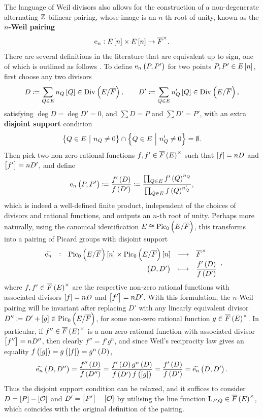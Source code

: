 The language of Weil divisors also allows for the construction of a non-degenerate alternating $ \mathbb{Z} $-bilinear pairing, whose image is an $ n $-th root of unity, known as the \textbf{$ n $-Weil pairing} \cite[Proposition III.8.1]{Sil09}
$$ \e_n : E\sbr{n} \times E\sbr{n} \to \overline{F}^\times. $$
There are several definitions in the literature that are equivalent up to sign, one of which is outlined as follows \cite[Exercise 3.16]{Sil09}. To define $ \e_n\br{P, P'} $ for two points $ P, P' \in E\sbr{n} $, first choose any two divisors
$$ D \coloneqq \sum_{Q \in E} n_Q\sbr{Q} \in \Div, \qquad D' \coloneqq \sum_{Q \in E} n_Q'\sbr{Q} \in \Div, $$
satisfying $ \deg D = \deg D' = 0 $, and $ \sum D = P $ and $ \sum D' = P' $, with an extra \textbf{disjoint support} condition
$$ \cbr{Q \in E \st n_Q \ne 0} \cap \cbr{Q \in E \st n_Q' \ne 0} = \emptyset. $$
Then pick two non-zero rational functions $ f, f' \in \overline{F}\br{E}^\times $ such that $ \sbr{f} = nD $ and $ \sbr{f'} = nD' $, and define
$$ \e_n\br{P, P'} \coloneqq \dfrac{f'\br{D}}{f\br{D'}} \coloneqq \dfrac{\prod_{Q \in E} f'\br{Q}^{n_Q}}{\prod_{Q \in E} f\br{Q}^{n_Q'}}, $$
which is indeed a well-defined finite product, independent of the choices of divisors and rational functions, and outputs an $ n $-th root of unity. Perhaps more naturally, using the canonical identification $ E \cong \Pic $, this transforms into a pairing of Picard groups with disjoint support
$$ \function[\widetilde{\e_n}]{\Pic\sbr{n} \times \Pic\sbr{n}}{\overline{F}^\times}{\br{D, D'}}{\dfrac{f'\br{D}}{f\br{D'}}}, $$
where $ f, f' \in \overline{F}\br{E}^\times $ are the respective non-zero rational functions with associated divisors $ \sbr{f} = nD $ and $ \sbr{f'} = nD' $. With this formulation, the $ n $-Weil pairing will be invariant after replacing $ D' $ with any linearly equivalent divisor $ D'' \coloneqq D' + \sbr{g} \in \Pic $, for some non-zero rational function $ g \in \overline{F}\br{E}^\times $. In particular, if $ f'' \in \overline{F}\br{E}^\times $ is a non-zero rational function with associated divisor $ \sbr{f''} = nD'' $, then clearly $ f'' = f'g^n $, and since Weil's reciprocity law \cite[Exercise 2.11]{Sil09} gives an equality $ f\br{\sbr{g}} = g\br{\sbr{f}} = g^n\br{D} $,
$$ \widetilde{\e_n}\br{D, D''} = \dfrac{f''\br{D}}{f\br{D''}} = \dfrac{f'\br{D}g^n\br{D}}{f\br{D'}f\br{\sbr{g}}} = \dfrac{f'\br{D}}{f\br{D'}} = \widetilde{\e_n}\br{D, D'}. $$
Thus the disjoint support condition can be relaxed, and it suffices to consider $ D = \sbr{P} - \sbr{\OOO} $ and $ D' = \sbr{P'} - \sbr{\OOO} $ by utilising the line function $ \L_{P, Q} \in \overline{F}\br{E}^\times $, which coincides with the original definition of the pairing.

